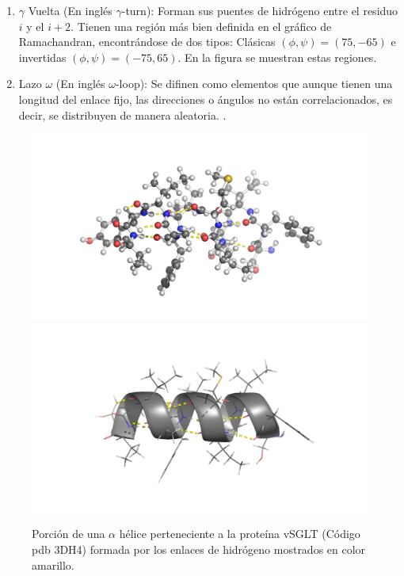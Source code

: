\begin{enumerate}
\begin{enumerate}
 \item $\gamma$ Vuelta (En ingl\'{e}s $\gamma$-turn): Forman sus puentes de hidr\'{o}geno entre el residuo $i$ y el $i+2$. Tienen una regi\'{o}n m\'{a}s bien definida en el gr\'{a}fico de Ramachandran, encontr\'{a}ndose de dos tipos: Cl\'{a}sicas $(\phi,\psi)=(75,-65)$ e invertidas $(\phi,\psi)=(-75,65)$. En la figura \label{fig:Rama} se muestran estas regiones.
  \item Lazo $\omega$ (En ingl\'{e}s $\omega$-loop): Se difinen como elementos que aunque tienen una longitud del enlace fijo, las direcciones o \'{a}ngulos no est\'{a}n correlacionados, es decir, se distribuyen de manera aleatoria. \cite{Smith1996}.
\end{enumerate}
\end{enumerate}
\begin{figure}[H]
\centering
\includegraphics[scale=0.2]{Kap3/helix.png}
\includegraphics[scale=0.2]{Kap3/helix2.png}
\caption{Porci\'{o}n de una $\alpha$ h\'{e}lice perteneciente a la prote\'{i}na vSGLT (C\'{o}digo pdb 3DH4) formada por los enlaces de hidr\'{o}geno mostrados en color amarillo.}\label{fig:helice}
\end{figure}
